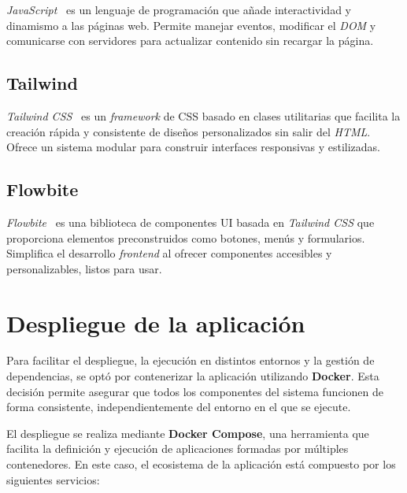 \textit{JavaScript}~\cite{web:javascript} es un lenguaje de programación que añade interactividad y dinamismo a las páginas web. 
Permite manejar eventos, modificar el \textit{DOM} y comunicarse con servidores para actualizar contenido sin recargar la página.

\subsection{Tailwind}

\textit{Tailwind CSS}~\cite{web:tailwind} es un \textit{framework} de CSS basado en clases utilitarias que facilita la creación rápida y consistente de 
diseños personalizados sin salir del \textit{HTML}. Ofrece un sistema modular para construir interfaces responsivas y estilizadas.

\subsection{Flowbite}

\textit{Flowbite}~\cite{web:flowbite} es una biblioteca de componentes UI basada en \textit{Tailwind CSS} que proporciona elementos preconstruidos como 
botones, menús y formularios. Simplifica el desarrollo \textit{frontend} al ofrecer componentes accesibles y 
personalizables, listos para usar.

\section{Despliegue de la aplicación}

Para facilitar el despliegue, la ejecución en distintos entornos y la gestión de dependencias, se optó por contenerizar la aplicación utilizando \textbf{Docker}. Esta decisión permite asegurar que todos los componentes del sistema funcionen de forma consistente, independientemente del entorno en el que se ejecute.

El despliegue se realiza mediante \textbf{Docker Compose}, una herramienta que facilita la definición y ejecución de aplicaciones formadas por múltiples contenedores. En este caso, el ecosistema de la aplicación está compuesto por los siguientes servicios:

